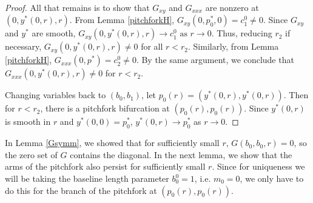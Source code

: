 \documentclass[thesis.tex]{subfiles}
\begin{document}
\begin{lemma}
\begin{proof}
All that remains is to show that $G_{xy}$ and $G_{xxx}$ are nonzero at $(0, y^*(0, r), r)$. From Lemma \ref{pitchforkH}, $G_{xy}(0, p_0^*, 0) = c_1^0 \neq 0$. Since $G_{xy}$ and $y^*$ are smooth, $G_{xy}(0, y^*(0, r), r) \rightarrow c_1^0 \text{ as } r \rightarrow 0$. Thus, reducing $r_2$ if necessary, $G_{xy}(0, y^*(0, r), r) \neq 0$ for all $r < r_2$. Similarly, from Lemma \ref{pitchforkH}, $G_{xxx}(0, p^*) = c_2^0 \neq 0$. By the same argument, we conclude that $G_{xxx}(0, y^*(0, r), r) \neq 0$ for $r < r_2$.

Changing variables back to $(b_0, b_1)$, let $p_0(r) = (y^*(0, r), y^*(0, r))$. Then for $r < r_2$, there is a pitchfork bifurcation at $(p_0(r), p_0(r))$. Since $y^*(0, r)$ is smooth in $r$ and $y^*(0, 0) = p_0^*$, $y^*(0, r) \rightarrow p_0^*$ as $r \rightarrow 0$.
\end{proof} 
\end{lemma}

In Lemma \ref{Gsymm}, we showed that for sufficiently small $r$, $G(b_0, b_0, r) = 0$, so the zero set of $G$ contains the diagonal. In the next lemma, we show that the arms of the pitchfork also persist for sufficiently small $r$. Since for uniqueness we will be taking the baseline length parameter $b_0^0 = 1$, i.e. $m_0 = 0$, we only have to do this for the branch of the pitchfork at $(p_0(r), p_0(r))$.
\end{document}
